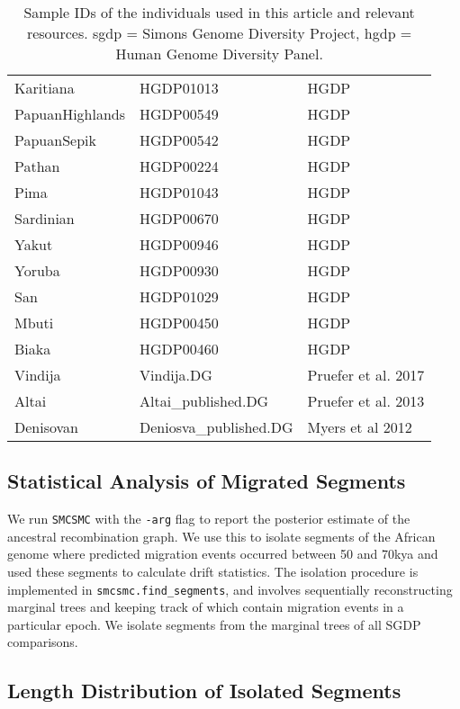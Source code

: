 \begin{table}[ht]
\begin{tabular}{lll}
      Karitiana & HGDP01013 & HGDP \\ 
      PapuanHighlands & HGDP00549 & HGDP \\ 
      PapuanSepik & HGDP00542 & HGDP \\ 
      Pathan & HGDP00224 & HGDP \\ 
      Pima & HGDP01043 & HGDP \\ 
      Sardinian & HGDP00670 & HGDP \\ 
      Yakut & HGDP00946 & HGDP \\ 
      Yoruba & HGDP00930 & HGDP \\ 
      San & HGDP01029 & HGDP \\ 
      Mbuti & HGDP00450 & HGDP \\ 
      Biaka & HGDP00460 & HGDP \\ 
      Vindija & Vindija.DG & Pruefer et al. 2017 \\ 
      Altai & Altai\_published.DG & Pruefer et al. 2013 \\ 
      Denisovan & Deniosva\_published.DG & Myers et al 2012 \\ 
       \hline
    \end{tabular}
    \caption{Sample IDs of the individuals used in this article and relevant resources. \gls{sgdp} = Simons Genome Diversity Project, \gls{hgdp} = Human Genome Diversity Panel.} 
    \label{samples}
    \end{table}
    

    \subsection{Statistical Analysis of Migrated Segments} \label{dstats_section}

    We run {\tt SMCSMC} with the {\tt -arg} flag to report the posterior estimate of the ancestral recombination graph. We use this to isolate segments of the African genome where predicted migration events occurred between 50 and 70kya and used these segments to calculate drift statistics. The isolation procedure is implemented in {\tt smcsmc.find\_segments}, and involves sequentially reconstructing marginal trees and keeping track of which contain migration events in a particular epoch. We isolate segments from the marginal trees of all SGDP comparisons. 

\subsection{Length Distribution of Isolated Segments}


